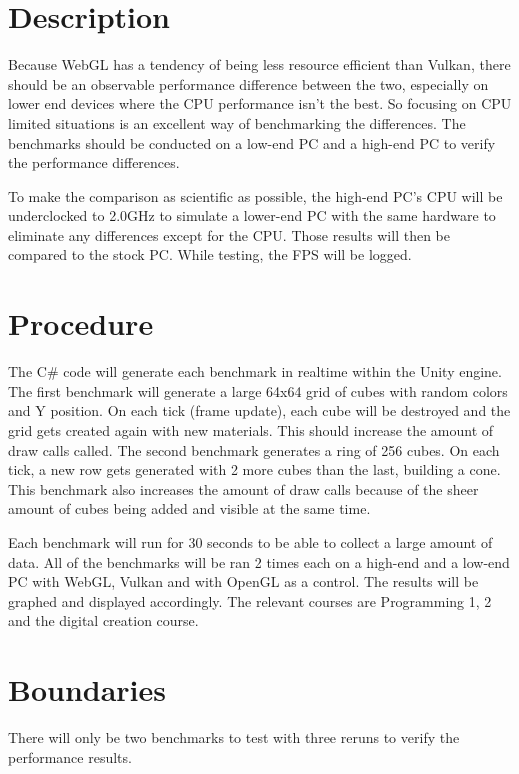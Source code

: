 \documentclass{article}
\begin{document}
\section{Description}
Because WebGL has a tendency of being less resource efficient than Vulkan, there should be an observable performance difference between the two, especially on lower end devices where the CPU performance isn’t the best. So focusing on CPU limited situations is an excellent way of benchmarking the differences. The benchmarks should be conducted on a low-end PC and a high-end PC to verify the performance differences. \par
To make the comparison as scientific as possible, the high-end PC’s CPU will be underclocked to 2.0GHz to simulate a lower-end PC with the same hardware to eliminate any differences except for the CPU. Those results will then be compared to the stock PC. While testing, the FPS will be logged.


\section{Procedure}
The C\# code will generate each benchmark in realtime within the Unity engine. The first benchmark will generate a large 64x64 grid of cubes with random colors and Y position. On each tick (frame update), each cube will be destroyed and the grid gets created again with new materials. This should increase the amount of draw calls called. The second benchmark generates a ring of 256 cubes. On each tick, a new row gets generated with 2 more cubes than the last, building a cone. This benchmark also increases the amount of draw calls because of the sheer amount of cubes being added and visible at the same time.\par

Each benchmark will run for 30 seconds to be able to collect a large amount of data. All of the benchmarks will be ran 2 times each on a high-end and a low-end PC with WebGL, Vulkan and with OpenGL as a control. The results will be graphed and displayed accordingly. The relevant courses are Programming 1, 2 and the digital creation course.

\section {Boundaries}
There will only be two benchmarks to test with three reruns to verify the performance results.
\end{document}
